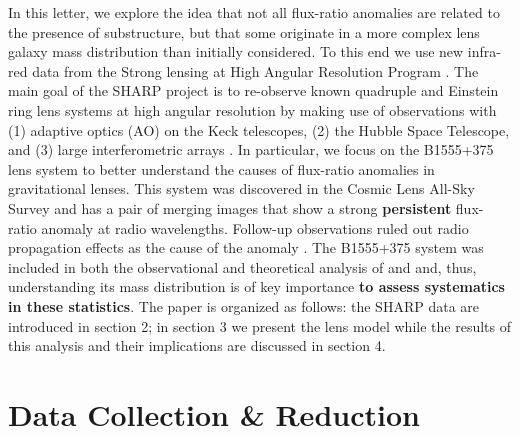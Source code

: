 \documentclass[useAMS,usenatbib]{mnras}
\begin{document}
In this letter, we explore the idea that not all flux-ratio anomalies are
related to the presence of substructure, but that some originate in a
more complex lens galaxy mass distribution than initially
considered. To this end we use new infra-red data from the Strong
lensing at High Angular Resolution Program 
\citep[SHARP;][Fassnacht et al., in prep]{SHARP12, V12}.
The main goal of the SHARP project is to re-observe known
quadruple and Einstein ring lens systems at high angular
resolution by making use of observations with (1) adaptive optics (AO)
on the Keck telescopes, (2) the Hubble Space Telescope, and (3) large
interferometric arrays \citep{SHARP12,V12}. In particular, 
we focus on the B1555+375 lens system\citep{Marlow99} to better
understand the causes of flux-ratio anomalies in gravitational lenses.  This system was
discovered in the Cosmic Lens All-Sky Survey \citep{CLASS1,CLASS2} and
has a pair of merging images that show a strong \textbf{persistent} flux-ratio anomaly at
radio wavelengths.  Follow-up observations ruled out radio propagation
effects as the cause of the anomaly \citep{K03,KD04}.  The B1555+375
system was included in both the observational and theoretical analysis
of \citet{Dalal2002} and \citet{Xu14} and, thus, understanding its
mass distribution is of key importance \textbf{to assess systematics in these statistics}.  
The paper is organized as follows: the  SHARP data are
introduced in section 2; in section 3 we present the lens model while
the results of this analysis and their implications are discussed in
section 4.

\section{Data Collection \& Reduction}
\end{document}
